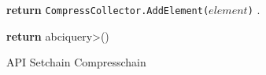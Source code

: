 \begin{figure}[t!]
  \begin{adjustbox}{minipage=[t]{\columnwidth}}
    \begin{algorithm}[H]
      \renewcommand{\thealgorithm}{API Compresschain}         
      \caption{\small API Setchain Compresschain}%
      \label{alg:api-brotli}%
      \small
      \begin{algorithmic}[1]
      
            \label{alg:brotli_add}
                \State \textbf{return} \texttt{CompressCollector.AddElement($element$)}
                .
            \EndFunction
      
            \label{alg:brotli_get}
                	\State \textbf{return} \<abciquery>()
            \EndFunction
            
        \end{algorithmic}
      \end{algorithm}
	\end{adjustbox}
  \end{figure}
